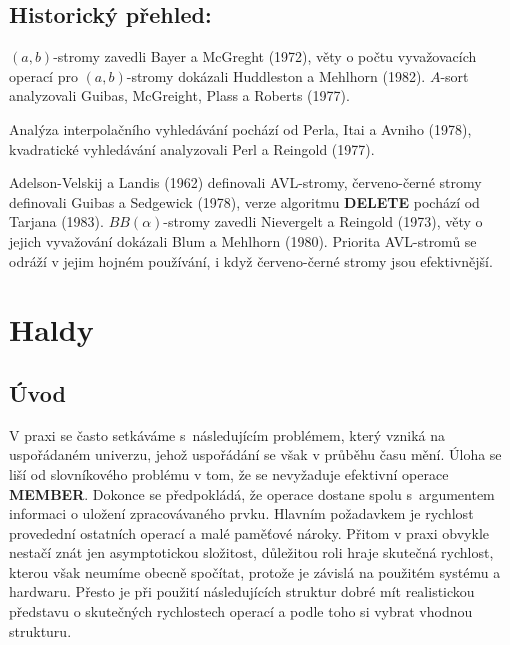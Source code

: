 \documentclass[a4paper,12pt]{article}
\begin{document}
\subsection{Historický přehled:}

$(a,b)$-stromy zavedli Bayer a McGreght (1972),\newline 
věty o počtu vyvažovacích operací pro $(a,b)$-stromy dokázali 
Huddleston a Mehlhorn (1982).\newline 
$A$-sort analyzovali Guibas, McGreight, Plass a Roberts (1977).

Analýza interpolačního vyhledávání pochází od Perla, 
Itai a Avniho (1978),\newline 
kvadratické vyhledávání analyzovali Perl a Reingold (1977).

Adelson-Velskij a Landis (1962) definovali 
AVL-stromy,\newline 
červeno-černé stromy definovali Guibas a Sedgewick 
(1978),\newline 
verze algoritmu {\bf DELETE} pochází od Tarjana (1983).
$BB(\alpha )$-stromy zavedli Nievergelt a Reingold (1973),\newline 
věty o jejich vyvažování dokázali Blum a Mehlhorn (1980).\newline 
Priorita AVL-stromů se odráží v 
jejim hojném používání, i když červeno-černé stromy 
jsou efektivnější.

\section{Haldy}
\subsection{Úvod}

V praxi se často setkáváme s~následujícím 
problémem, který vzniká na uspořádaném univerzu, jehož 
uspořádání se však v průběhu času mění. Úloha se 
liší od slovníkového problému v tom, že se nevyžaduje  
efektivní operace {\bf MEMBER}. Dokonce se předpokládá, že ope\-race 
dostane spolu s~argumentem informaci o uložení 
zpracovávaného prvku. 
Hlav\-ním požadavkem je rychlost provedední ostatních operací a malé 
paměťové nároky. Přitom v praxi obvykle nestačí znát jen 
asymptotickou složitost, důležitou roli hraje skutečná 
rychlost, kterou však neumíme obecně spočítat, protože je závislá na 
použitém systému a hardwaru. Přesto je při použití 
následujících struktur dobré mít realistickou představu o 
skutečných rychlostech operací a podle toho si vybrat 
vhodnou strukturu. 
\end{document}
